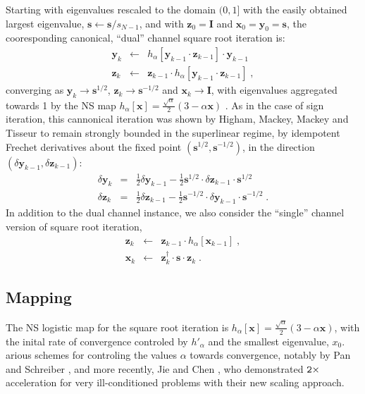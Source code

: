 \documentclass[letterpaper,twocolumn,amsmath,amsfont,amssymb,english,aps,jcp,preprintnumbers,groupaddress,nofootinbib,tightenlines,floatfix]{revtex4}
\newcommand{\mat}[1]{\boldsymbol{#1}}
\theoremstyle{plain}
\theoremstyle{remark}
\theoremstyle{plain}
\begin{document}
Starting with eigenvalues rescaled to the domain $(0,1]$ with the easily obtained 
largest eigenvalue,   $\mat{s} \leftarrow \mat{s}/s_{N-1}$, and with $\mat{z}_0=\mat{I}$ and 
$\mat{x}_0=\mat{y}_0=\mat{s}$, the cooresponding canonical,  ``dual'' channel square root iteration is:
\begin{eqnarray}\label{cannonical}
\mat{y}_k &\leftarrow& h_\alpha \left[ \mat{y}_{k-1} \cdot \mat{z}_{k-1} \right] \cdot \mat{y}_{k-1}  \nonumber \\
\mat{z}_k &\leftarrow& \mat{z}_{k-1} \cdot h_\alpha \left[ \mat{y}_{k-1} \cdot \mat{z}_{k-1} \right] \; ,
\end{eqnarray}
converging as ${\mat{y}}_k \rightarrow \mat{s}^{1/2}$, ${\mat{z}}_k \rightarrow \mat{s}^{-1/2}$ and
${\mat{x}}_k \rightarrow {\mat{I}}$, with eigenvalues aggregated towards 1 by 
the NS map $h_\alpha[\mat{x}]=\frac{\sqrt{\alpha}}{2} \left(3-\alpha \mat{x} \right)$ \cite{}.  
As in the case of sign iteration, this cannonical iteration was shown by Higham, Mackey, Mackey and
Tisseur \cite{Higham2005} to remain strongly bounded in the superlinear regime, by idempotent Frechet derivatives about the fixed point
$\left(\mat{s}^{1/2},\mat{s}^{-1/2}\right)$, in the direction $\left(
\delta \mat{y}_{k-1} , \delta \mat{z}_{k-1} \right)$:
\begin{eqnarray}
\delta \mat{y}_k &=& \frac{1}{2} \delta \mat{y}_{k-1} - \frac{1}{2} \mat{s}^{1/2} \cdot \delta \mat{z}_{k-1} \cdot \mat{s}^{1/2} \\
\delta \mat{z}_k &=& \frac{1}{2} \delta \mat{z}_{k-1} - \frac{1}{2} \mat{s}^{-1/2} \cdot \delta \mat{y}_{k-1} \cdot \mat{s}^{-1/2} \;.
\end{eqnarray}
In addition to the dual channel instance, we also consider the ``single'' channel version of square root iteration,
\begin{eqnarray}\label{single}
\mat{z}_k &\leftarrow& \mat{z}_{k-1} \cdot h_\alpha \left[ \mat{x}_{k-1} \right] \; , \nonumber \\
\mat{x}_k &\leftarrow&  \mat{z}^\dagger_{k} \cdot \mat{s} \cdot \mat{z}_{k} \; .
\end{eqnarray}

\subsection{Mapping}\label{map}
The NS logistic map for the square root iteration is $h_\alpha[\mat{x}]=\frac{\sqrt{\alpha}}{2} \left(3-\alpha \mat{x} \right)$, 
with the inital rate of convergence controled by $h'_\alpha$ and the smallest eigenvalue, $x_0$. 
arious schemes for controling the values $\alpha$ towards convergence, 
notably  by Pan and Schreiber \cite{Pan1991}, and more recently, Jie and Chen \cite{Chen2014}, who demonstrated  $\tt 2 \times$
acceleration for very ill-conditioned problems with their new scaling approach. 
\end{document}
